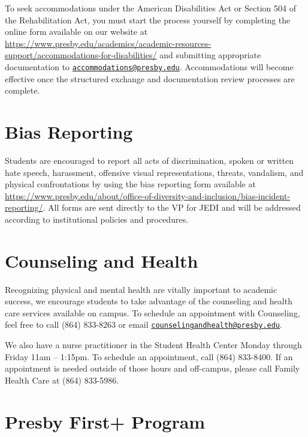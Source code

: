\documentclass[
]{book}
\begin{document}
To seek accommodations under the American Disabilities Act or Section 504 of the Rehabilitation Act, you must start the process yourself by completing the online form available on our website at \url{https://www.presby.edu/academics/academic-resources-support/accommodations-for-disabilities/} and submitting appropriate documentation to \href{mailto:accommodations@presby.edu}{\nolinkurl{accommodations@presby.edu}}. Accommodations will become effective once the structured exchange and documentation review processes are complete.

\hypertarget{bias-reporting}{%
\section*{Bias Reporting}\label{bias-reporting}}

Students are encouraged to report all acts of discrimination, spoken or written hate speech, harassment, offensive visual representations, threats, vandalism, and physical confrontations by using the bias reporting form available at \url{https://www.presby.edu/about/office-of-diversity-and-inclusion/bias-incident-reporting/}. All forms are sent directly to the VP for JEDI and will be addressed according to institutional policies and procedures.

\hypertarget{counseling-and-health}{%
\section*{Counseling and Health}\label{counseling-and-health}}

Recognizing physical and mental health are vitally important to academic success, we encourage students to take advantage of the counseling and health care services available on campus. To schedule an appointment with Counseling, feel free to call (864) 833-8263 or email \href{mailto:counselingandhealth@presby.edu}{\nolinkurl{counselingandhealth@presby.edu}}.

We also have a nurse practitioner in the Student Health Center Monday through Friday 11am -- 1:15pm. To schedule an appointment, call (864) 833-8400. If an appointment is needed outside of those hours and off-campus, please call Family Health Care at (864) 833-5986.

\hypertarget{presby-first-program}{%
\section*{Presby First+ Program}\label{presby-first-program}}
\end{document}
